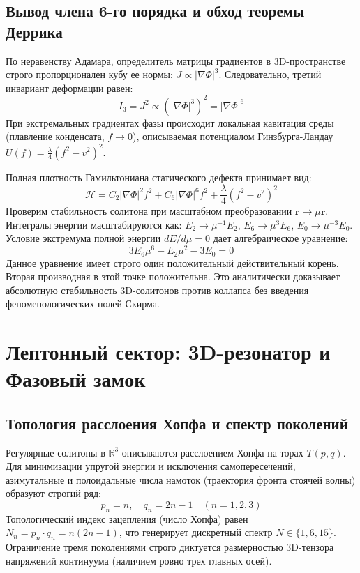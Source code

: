 \documentclass[12pt,a4paper]{article}
\begin{document}
	\subsection{Вывод члена 6-го порядка и обход теоремы Деррика}
	По неравенству Адамара, определитель матрицы градиентов в 3D-пространстве строго пропорционален кубу ее нормы: $J \propto |\nabla \Phi|^3$. Следовательно, третий инвариант деформации равен:
	\begin{equation}
		I_3 = J^2 \propto \left( |\nabla \Phi|^3 \right)^2 = |\nabla \Phi|^6
	\end{equation}
	При экстремальных градиентах фазы происходит локальная кавитация среды (плавление конденсата, $f \to 0$), описываемая потенциалом Гинзбурга-Ландау $U(f) = \frac{\lambda}{4}(f^2 - v^2)^2$. 
	
	Полная плотность Гамильтониана статического дефекта принимает вид:
	\begin{equation}
		\mathcal{H} = C_2 |\nabla \Phi|^2 f^2 + C_6 |\nabla \Phi|^6 f^2 + \frac{\lambda}{4}(f^2 - v^2)^2
	\end{equation}
	Проверим стабильность солитона при масштабном преобразовании $\mathbf{r} \to \mu \mathbf{r}$. Интегралы энергии масштабируются как:
	$E_2 \to \mu^{-1} E_2$, $E_6 \to \mu^3 E_6$, $E_0 \to \mu^{-3} E_0$.
	Условие экстремума полной энергии $dE/d\mu = 0$ дает алгебраическое уравнение:
	\begin{equation}
		3 E_6 \mu^6 - E_2 \mu^2 - 3 E_0 = 0
	\end{equation}
	Данное уравнение имеет строго один положительный действительный корень. Вторая производная в этой точке положительна. Это аналитически доказывает абсолютную стабильность 3D-солитонов против коллапса без введения феноменологических полей Скирма.
	
	\section{Лептонный сектор: 3D-резонатор и Фазовый замок}
	
	\subsection{Топология расслоения Хопфа и спектр поколений}
	Регулярные солитоны в $\mathbb{R}^3$ описываются расслоением Хопфа на торах $T(p,q)$. Для минимизации упругой энергии и исключения самопересечений, азимутальные и полоидальные числа намоток (траектория фронта стоячей волны) образуют строгий ряд:
	\begin{equation}
		p_n = n, \quad q_n = 2n - 1 \quad (n = 1, 2, 3)
	\end{equation}
	Топологический индекс зацепления (число Хопфа) равен $N_n = p_n \cdot q_n = n(2n-1)$, что генерирует дискретный спектр $N \in \{1, 6, 15\}$. Ограничение тремя поколениями строго диктуется размерностью 3D-тензора напряжений континуума (наличием ровно трех главных осей).
	
\end{document}
